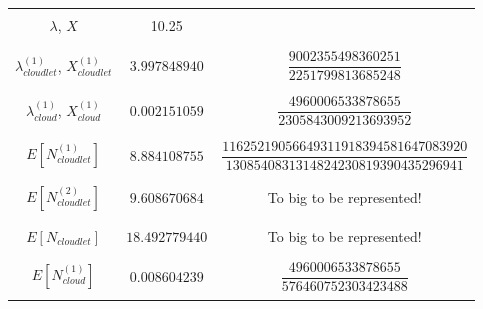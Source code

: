 \documentclass[10pt,a4paper]{article}
\begin{document}
\begin{table}[h!]
\begin{adjustbox}{center=\textwidth}
\begin{tabular}{c|c|c}
	 &&\\\hline &&\\

	 $\lambda$, $X$ & 10.25 & \\
	 
	 &&\\\hline &&\\
	
	 $\lambda_{cloudlet}^{(1)}$, $X_{cloudlet}^{(1)}$ & $3.997848940$ & $\dfrac{9002355498360251}{2251799813685248}$ \\
	 
	 &&\\\hline &&\\
	
	 $\lambda_{cloud}^{(1)}$, $X_{cloud}^{(1)}$ & $0.002151059$ & $\dfrac{4960006533878655}{2305843009213693952}$ \\

     &&\\\hline &&\\
     
     $E[N^{(1)}_{cloudlet}]$ & $8.884108755$ & $\dfrac{11625219056649311918394581647083920}{1308540831314824230819390435296941}$ \\
     
     &&\\\hline &&\\
     
     $E[N^{(2)}_{cloudlet}]$ & $9.608670684$ & To big to be represented! \\
     
	 &&\\\hline &&\\
     
     $E[N_{cloudlet}]$ & $ 18.492779440$ & To big to be represented! \\     
     
	 &&\\\hline &&\\
     
     $E[N^{(1)}_{cloud}]$ & $0.008604239$ & $\dfrac{4960006533878655}{576460752303423488}$ \\
  
     &&\\


     \bottomrule

    \end{tabular}
    \end{adjustbox}
\end{table}
\end{document}
